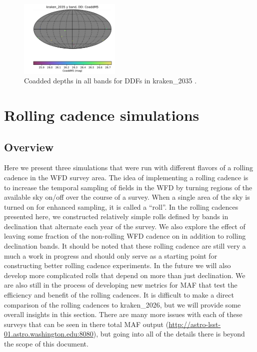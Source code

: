 \documentclass[DM,lsstdraft,authoryear,toc]{lsstdoc}
\begin{document}
\begin{figure}[ht]
\includegraphics[width=0.43\textwidth]{figures/kraken_2035_CoaddM5_y_band_DD_HEAL_SkyMap.pdf}
\caption{Coadded depths in all bands for DDFs in kraken\_2035 .}
\label{fig:ddcoad-2035}
\end{figure}

\clearpage

\section{Rolling cadence simulations}

\subsection{Overview}

Here we present three simulations that were run with different flavors of a rolling cadence in the WFD survey area.
The idea of implementing a rolling cadence is to increase the temporal sampling of fields in the WFD by turning
regions of the available sky on/off over the course of a survey. When a single area of the sky is turned on for 
enhanced sampling, it is called a ``roll''. In the rolling cadences presented here, we constructed relatively simple
rolls defined by bands in declination that alternate each year of the survey. We also explore the
effect of leaving some fraction of the non-rolling WFD cadence on in addition to rolling declination bands.
It should be noted that these rolling cadence are still very a much a work in progress and should only
serve as a starting point for constructing better rolling cadence experiments. In the future we will also develop more
complicated rolls that depend on more than just declination. We are also still in the process of developing new
metrics for MAF that test the efficiency and benefit of the rolling cadences. It is difficult to make a direct comparison
of the rolling cadences to kraken\_2026, but we will provide some overall insights in this section. There are many
more issues with each of these surveys that can be seen in there total MAF output (\url{http://astro-lsst-01.astro.washington.edu:8080}), 
but going into all of the details there is beyond the scope of this document.
\end{document}
